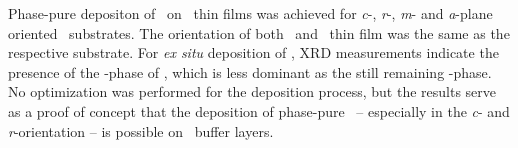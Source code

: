 Phase-pure depositon of \agao\ on \cro\ thin films was achieved for \textit{c}-, \textit{r}-, \textit{m}- and \textit{a}-plane oriented \alo\ substrates.
The orientation of both \cro\ and \agao\ thin film was the same as the respective substrate.
For \textit{ex situ} deposition of \gao, XRD measurements indicate the presence of the \textbeta-phase of \gao, which is less dominant as the still remaining \textalpha-phase.
No optimization was performed for the deposition process, but the results serve as a proof of concept that the deposition of phase-pure \agao\ -- especially in the \textit{c}- and \textit{r}-orientation -- is possible on \cro\ buffer layers.